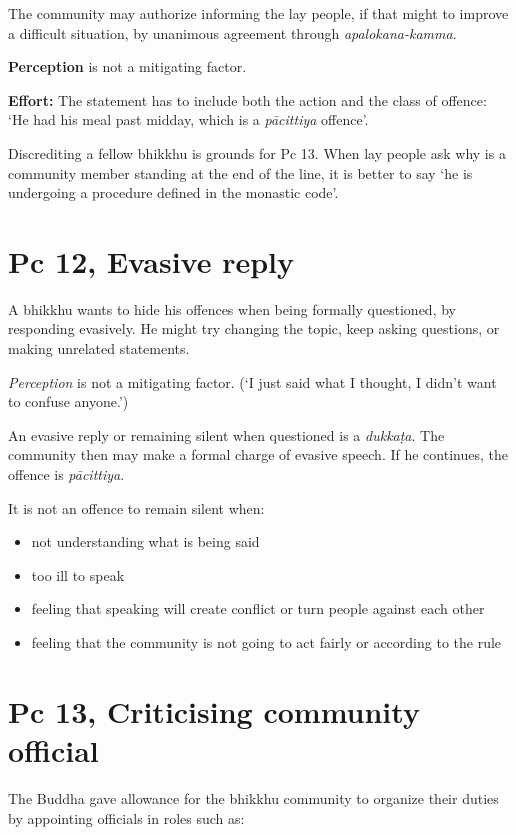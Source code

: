 The community may authorize informing the lay people, if that might to
improve a difficult situation, by unanimous agreement through
\emph{apalokana-kamma}.

\textbf{Perception} is not a mitigating factor.

\textbf{Effort:} The statement has to include both the action and the
class of offence: `He had his meal past midday, which is a
\emph{pācittiya} offence'.

Discrediting a fellow bhikkhu is grounds for Pc 13. When lay people ask
why is a community member standing at the end of the line, it is better
to say `he is undergoing a procedure defined in the monastic code'.

\section{Pc 12, Evasive reply}

A bhikkhu wants to hide his offences when being formally questioned, by
responding evasively. He might try changing the topic, keep asking
questions, or making unrelated statements.

\emph{Perception} is not a mitigating factor. (`I just said what I
thought, I didn't want to confuse anyone.')

An evasive reply or remaining silent when questioned is a
\emph{dukkaṭa}. The community then may make a formal charge of evasive
speech. If he continues, the offence is \emph{pācittiya}.

It is not an offence to remain silent when:

\begin{itemize}
\tightlist
\item
  not understanding what is being said
\item
  too ill to speak
\item
  feeling that speaking will create conflict or turn people against each
  other
\item
  feeling that the community is not going to act fairly or according to
  the rule
\end{itemize}

\section{Pc 13, Criticising community official}

The Buddha gave allowance for the bhikkhu community to organize their
duties by appointing officials in roles such as:

